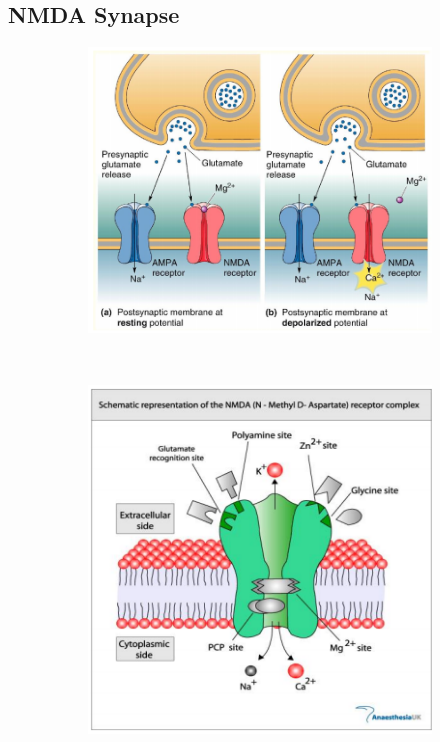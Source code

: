 \documentclass[a4paper, 12pt]{article}
\begin{document}
\subsection{NMDA Synapse}
\begin{figure}[H]
	\centering
	\begin{subfigure}[b]{0.5\textwidth}
    	\centering
		\includegraphics[width=\textwidth]{NMDA_receptor_01.png}
	\end{subfigure}%
	~
	\begin{subfigure}[b]{0.5\textwidth}
		\centering
		\includegraphics[width=\textwidth]{NMDA_receptor_02.png}
	\end{subfigure}
\end{figure}
\end{document}
